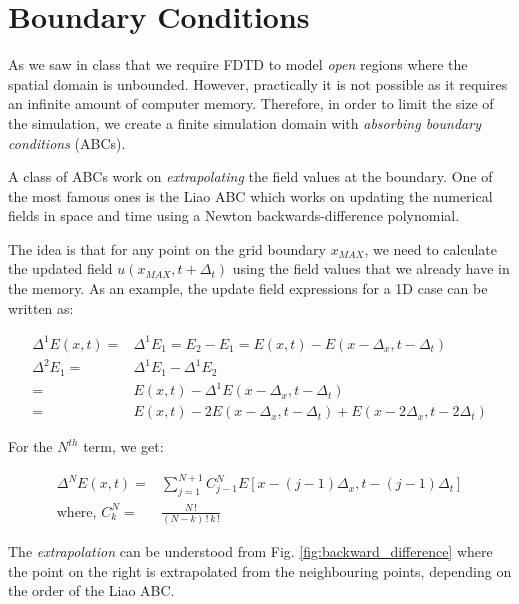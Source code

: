 \documentclass[11pt]{article}
\begin{document}
\section{Boundary Conditions}

As we saw in class that we require FDTD to model \textit{open} regions where the spatial domain is unbounded. However, practically it is not possible as it requires an infinite amount of computer memory. Therefore, in order to limit the size of the simulation, we create a finite simulation domain with \textit{absorbing boundary conditions} (ABCs).

A class of ABCs work on \textit{extrapolating} the field values at the boundary. One of the most famous ones is the Liao ABC \cite{liao_transmitting_1984} which works on updating the numerical fields in space and time using a Newton backwards-difference polynomial.


The idea is that for any point on the grid boundary $x_{MAX}$, we need to calculate the updated field $u(x_{MAX}, t + \Delta_t)$ using the field values that we already have in the memory. As an example, the update field expressions for a 1D case can be written as:

\begin{align}
  \Delta^1 E(x ,t) ={} & \Delta^1 E_1 = E_2 - E_1  = E(x,t) - E(x - \Delta_x, t - \Delta_t) \nonumber \\
  \Delta^2 E_1 ={}     & \Delta^1 E_1 - \Delta^1 E_2 \nonumber                                        \\
  ={}                  & E(x,t) - \Delta^1 E(x - \Delta_x, t - \Delta_t) \nonumber                    \\
  ={}                  & E(x,t) - 2E(x - \Delta_x, t - \Delta_t) + E(x - 2\Delta_x, t - 2\Delta_t)
\end{align}

For the $N^{th}$ term, we get:

\begin{align}
  \Delta^N E(x ,t) ={}         & \sum_{j = 1}^{N+1} C_{j-1}^{N} E\left[x - (j -1)\Delta_x, t - (j -1)\Delta_t\right] \nonumber \\
  \mathrm{where,} \, C_k^N ={} & \frac{N\,!}{(N - k)\,! \, k\,!}
\end{align}

The \textit{extrapolation} can be understood from Fig. \ref{fig:backward_difference} where the point on the right is extrapolated from the neighbouring points, depending on the order of the Liao ABC.
\end{document}

